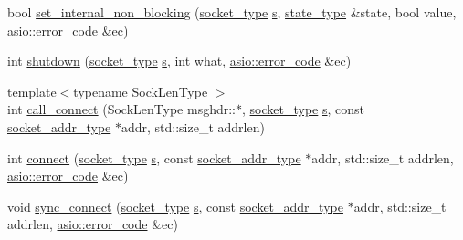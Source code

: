 \begin{DoxyCompactItemize}
\item 
bool \hyperlink{namespaceasio_1_1detail_1_1socket__ops_a38ae624d853beaee58adc2c46d86054e}{set\+\_\+internal\+\_\+non\+\_\+blocking} (\hyperlink{namespaceasio_1_1detail_a6798c771dd84b79798b1a08150706ea9}{socket\+\_\+type} \hyperlink{group__async__connect_ga31ab74b9ea6c77932dddd016cfc7920a}{s}, \hyperlink{namespaceasio_1_1detail_1_1socket__ops_a5ce32ee297edef8833113ea35a933054}{state\+\_\+type} \&state, bool value, \hyperlink{classasio_1_1error__code}{asio\+::error\+\_\+code} \&ec)
\item 
int \hyperlink{namespaceasio_1_1detail_1_1socket__ops_a52f4bb543e335864660c9ea062c793c5}{shutdown} (\hyperlink{namespaceasio_1_1detail_a6798c771dd84b79798b1a08150706ea9}{socket\+\_\+type} \hyperlink{group__async__connect_ga31ab74b9ea6c77932dddd016cfc7920a}{s}, int what, \hyperlink{classasio_1_1error__code}{asio\+::error\+\_\+code} \&ec)
\item 
{\footnotesize template$<$typename Sock\+Len\+Type $>$ }\\int \hyperlink{namespaceasio_1_1detail_1_1socket__ops_a7ad2e5ff21f72942315721737b2a9f86}{call\+\_\+connect} (Sock\+Len\+Type msghdr\+::$\ast$, \hyperlink{namespaceasio_1_1detail_a6798c771dd84b79798b1a08150706ea9}{socket\+\_\+type} \hyperlink{group__async__connect_ga31ab74b9ea6c77932dddd016cfc7920a}{s}, const \hyperlink{namespaceasio_1_1detail_a40a7b0385a38f87815ffbb8df5e34d05}{socket\+\_\+addr\+\_\+type} $\ast$addr, std\+::size\+\_\+t addrlen)
\item 
int \hyperlink{namespaceasio_1_1detail_1_1socket__ops_a7ecc6977534593ecb57fa31503300524}{connect} (\hyperlink{namespaceasio_1_1detail_a6798c771dd84b79798b1a08150706ea9}{socket\+\_\+type} \hyperlink{group__async__connect_ga31ab74b9ea6c77932dddd016cfc7920a}{s}, const \hyperlink{namespaceasio_1_1detail_a40a7b0385a38f87815ffbb8df5e34d05}{socket\+\_\+addr\+\_\+type} $\ast$addr, std\+::size\+\_\+t addrlen, \hyperlink{classasio_1_1error__code}{asio\+::error\+\_\+code} \&ec)
\item 
void \hyperlink{namespaceasio_1_1detail_1_1socket__ops_a78f17afc95370e9de0db689b33108a5c}{sync\+\_\+connect} (\hyperlink{namespaceasio_1_1detail_a6798c771dd84b79798b1a08150706ea9}{socket\+\_\+type} \hyperlink{group__async__connect_ga31ab74b9ea6c77932dddd016cfc7920a}{s}, const \hyperlink{namespaceasio_1_1detail_a40a7b0385a38f87815ffbb8df5e34d05}{socket\+\_\+addr\+\_\+type} $\ast$addr, std\+::size\+\_\+t addrlen, \hyperlink{classasio_1_1error__code}{asio\+::error\+\_\+code} \&ec)
\item 

\end{DoxyCompactItemize}
